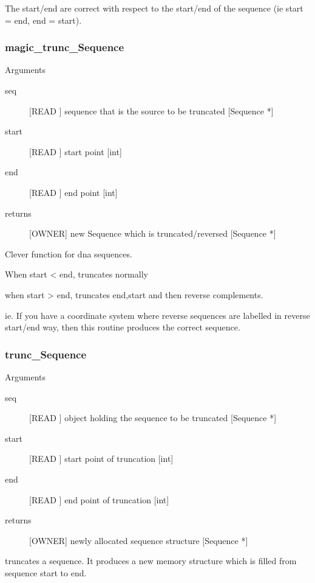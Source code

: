 The start/end are correct with respect to the start/end
of the sequence (ie start = end, end = start).


\subsubsection{magic_trunc_Sequence}

Arguments
\begin{description}
\item[seq] [READ ] sequence that is the source to be truncated [Sequence *]
\item[start] [READ ] start point [int]
\item[end] [READ ] end point [int]
\item[returns] [OWNER] new Sequence which is truncated/reversed [Sequence *]
\end{description}
Clever function for dna sequences.


When start < end, truncates normally


when start > end, truncates end,start and then
reverse complements.


ie. If you have a coordinate system where reverse 
sequences are labelled in reverse start/end way,
then this routine produces the correct sequence.


\subsubsection{trunc_Sequence}

Arguments
\begin{description}
\item[seq] [READ ] object holding the sequence to be truncated [Sequence *]
\item[start] [READ ] start point of truncation [int]
\item[end] [READ ] end point of truncation [int]
\item[returns] [OWNER] newly allocated sequence structure [Sequence *]
\end{description}
truncates a sequence. It produces a new memory structure
which is filled from sequence start to end.


